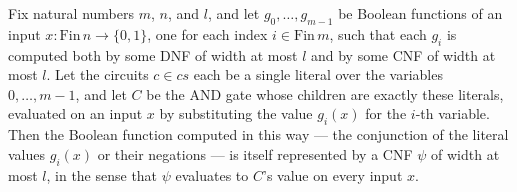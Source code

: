\begin{lemma}
\label{LMN.and_of_lit_children_cnf}
\leanok
{}
Fix natural numbers $m$, $n$, and $l$, and let $g_0, \dots, g_{m-1}$ be Boolean
functions of an input $x : \mathrm{Fin}\,n \to \{0,1\}$, one for each index $i \in
\mathrm{Fin}\,m$, such that each $g_i$ is computed both by some DNF of width at most $l$
and by some CNF of width at most $l$. Let the circuits $c \in cs$ each be a single
literal over the variables $0, \dots, m-1$, and let $C$ be the AND gate whose children
are exactly these literals, evaluated on an input $x$ by substituting the value $g_i(x)$
for the $i$-th variable. Then the Boolean function computed in this way — the
conjunction of the literal values $g_i(x)$ or their negations — is itself represented by
a CNF $\psi$ of width at most $l$, in the sense that $\psi$ evaluates to $C$'s value on
every input $x$.
\end{lemma}

